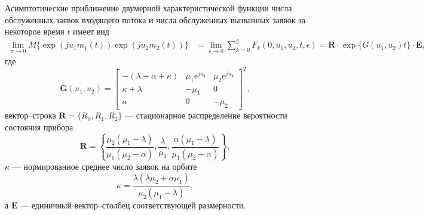 \begin{theorem}
	Асимптотические приближение двумерной характеристической функции числа обслуженных заявок входящего потока и числа обслуженных вызванных заявок за некоторое время $t$ имеет вид
	\begin{equation*} \label{theorem_twodim}
		\begin{split}
			  \lim_{\sigma \xrightarrow{} 0} M\{\exp(ju_{1}m_{1}(t))\exp(ju_{2}m_{2}(t))\} &= \lim_{\epsilon \xrightarrow{} 0} \sum_{k=0}^{2}F_{k}(0,u_{1},u_{2},t,\epsilon) = \boldsymbol{R} \cdot \exp\{G(u_{1},u_{2})t\} \cdot \boldsymbol{E},
		\end{split}
	\end{equation*}
	где 
	\begin{equation*}
		\boldsymbol{G}(u_{1},u_{2})=\begin{bmatrix}
			-(\lambda + \alpha + \kappa) & \mu_{1}e^{ju_{1}} &  \mu_{2}e^{ju_{2}}\\
			\kappa+\lambda & -\mu_{1} & 0\\
			\alpha & 	0 &	-\mu_{2}
		\end{bmatrix}^{T},
	\end{equation*}
	вектор--строка $\boldsymbol{R}=\{R_{0},R_{1},R_{2}\}$ --- стационарное распределение вероятности состояния прибора
	\begin{equation*}
		\boldsymbol{R}=\left\{\frac{\mu_{2}(\mu_{1} - \lambda)}{\mu_{1}(\mu_{2} - \alpha)},\frac{\lambda}{\mu_{1}},\frac{\alpha(\mu_{1} - \lambda)}{\mu_{1}(\mu_{2} + \alpha)}\right\},
	\end{equation*}
	$\kappa$ --- нормированное среднее число заявок на орбите
	\begin{equation*}
		\kappa = \frac{\lambda(\lambda \mu_{2} + \alpha \mu_{1})}{\mu_{2}(\mu_{1} - \lambda)},
	\end{equation*}
	а $\boldsymbol{E}$ --- единичный вектор--столбец соответствующей размерности.
\end{theorem}
